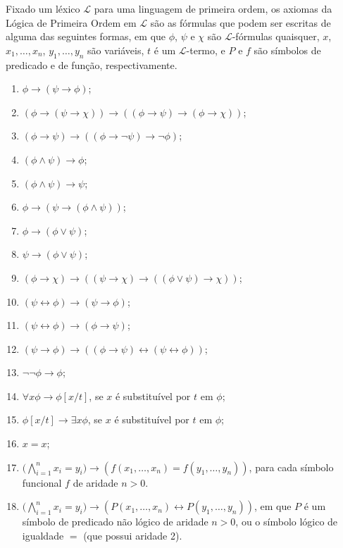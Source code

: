 \begin{metadefinition}\label{mdef:axiomasLogicaPrimeiraOrdem}
    Fixado um léxico $\mathcal L$ para uma linguagem de primeira ordem, os axiomas da Lógica de Primeira Ordem em $\mathcal L$ são as fórmulas que podem ser escritas de alguma das seguintes formas, em que $\phi$, $\psi$ e $\chi$ são $\mathcal L$-fórmulas quaisquer, $x$, $x_1,\dots,x_n$, $y_1,\dots,y_n$ são variáveis, $t$ é um $\mathcal L$-termo, e $P$ e $f$ são símbolos de predicado e de função, respectivamente.
    \begin{enumerate}[label=(FO\arabic*)]
        \item $\phi \rightarrow (\psi \rightarrow \phi)$;
        \item $(\phi \rightarrow (\psi \rightarrow \chi)) \rightarrow ((\phi \rightarrow \psi) \rightarrow (\phi \rightarrow \chi))$;
        \item $(\phi \rightarrow \psi) \rightarrow ((\phi \rightarrow \neg \psi) \rightarrow \neg \phi)$;
        \item $(\phi \land \psi) \rightarrow \phi$;
        \item $(\phi \land \psi) \rightarrow \psi$;
        \item $\phi \rightarrow (\psi \rightarrow (\phi \land \psi))$;
        \item $\phi \rightarrow (\phi \lor \psi)$;
        \item $\psi \rightarrow (\phi \lor \psi)$;
        \item $(\phi \rightarrow \chi) \rightarrow ((\psi \rightarrow \chi) \rightarrow ((\phi \lor \psi) \rightarrow \chi))$;
        \item $(\psi \leftrightarrow \phi) \rightarrow (\psi \rightarrow \phi)$;
        \item $(\psi \leftrightarrow \phi) \rightarrow (\phi \rightarrow \psi)$;
        \item $(\psi \rightarrow \phi) \rightarrow ((\phi \rightarrow \psi) \leftrightarrow (\psi \leftrightarrow \phi))$;
        \item $\neg \neg \phi \rightarrow \phi$;
        \item $\forall x \phi \rightarrow \phi[x/t]$, se $x$ é substituível por $t$ em $\phi$;
        \item $\phi[x/t] \rightarrow \exists x \phi$, se $x$ é substituível por $t$ em $\phi$;
        \item $x=x$;
        \item $\bigl(\bigwedge_{i=1}^n x_i=y_i\bigr) \rightarrow (f(x_1, \dots, x_n)=f(y_1, \dots, y_n))$, para cada símbolo funcional $f$ de aridade $n>0$.
        \item $\bigl(\bigwedge_{i=1}^n x_i=y_i\bigr) \rightarrow (P(x_1, \dots, x_n) \leftrightarrow P(y_1, \dots, y_n))$, em que $P$ é um símbolo de predicado não lógico de aridade $n>0$, ou o símbolo lógico de igualdade $=$ (que possui aridade 2).
        \end{enumerate}


\end{metadefinition}
